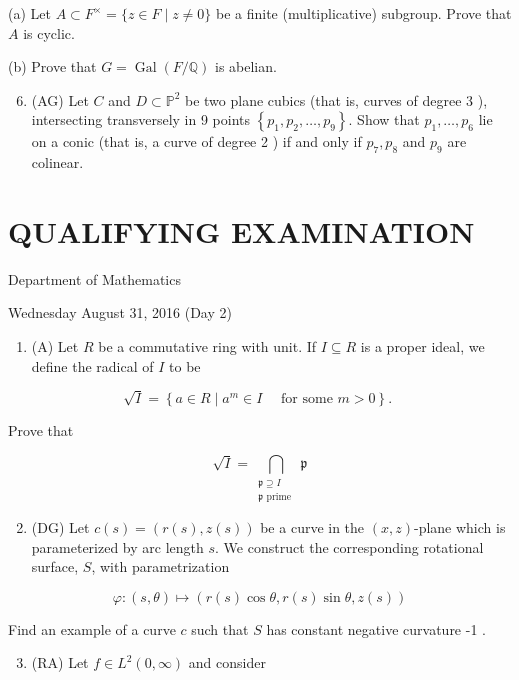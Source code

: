 \documentclass[10pt]{article}
\begin{document}
(a) Let $A \subset F^{\times}=\{z \in F \mid z \neq 0\}$ be a finite (multiplicative) subgroup. Prove that $A$ is cyclic.

(b) Prove that $G=\operatorname{Gal}(F / \mathbb{Q})$ is abelian.

\begin{enumerate}
  \setcounter{enumi}{5}
  \item (AG) Let $C$ and $D \subset \mathbb{P}^{2}$ be two plane cubics (that is, curves of degree 3 ), intersecting transversely in 9 points $\left\{p_{1}, p_{2}, \ldots, p_{9}\right\}$. Show that $p_{1}, \ldots, p_{6}$ lie on a conic (that is, a curve of degree 2 ) if and only if $p_{7}, p_{8}$ and $p_{9}$ are colinear.
\end{enumerate}

\section*{QUALIFYING EXAMINATION }
Department of Mathematics

Wednesday August 31, 2016 (Day 2)

\begin{enumerate}
  \item (A) Let $R$ be a commutative ring with unit. If $I \subseteq R$ is a proper ideal, we define the radical of $I$ to be
\end{enumerate}

$$
\sqrt{I}=\left\{a \in R \mid a^{m} \in I \quad \text { for some } m>0\right\} \text {. }
$$

Prove that

$$
\sqrt{I}=\bigcap_{\substack{\mathfrak{p} \supseteq I \\ \mathfrak{p} \text { prime }}} \mathfrak{p}
$$

\begin{enumerate}
  \setcounter{enumi}{1}
  \item (DG) Let $c(s)=(r(s), z(s))$ be a curve in the $(x, z)$-plane which is parameterized by arc length $s$. We construct the corresponding rotational surface, $S$, with parametrization
\end{enumerate}

$$
\varphi:(s, \theta) \mapsto(r(s) \cos \theta, r(s) \sin \theta, z(s))
$$

Find an example of a curve $c$ such that $S$ has constant negative curvature -1 .

\begin{enumerate}
  \setcounter{enumi}{2}
  \item (RA) Let $f \in L^{2}(0, \infty)$ and consider
\end{enumerate}
\end{document}
